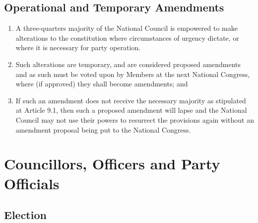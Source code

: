 \documentclass[a4paper,titlepage,8.5pt]{article}
\begin{document}
\subsection{Operational and Temporary Amendments}

\begin{enumerate}
\item A three-quarters majority of the National Council is empowered to make alterations to the constitution where circumstances of urgency dictate, or where it is necessary for party operation.
\item Such alterations are temporary, and are considered proposed amendments and as such must be voted upon by Members at the next National Congress, where (if approved) they shall become amendments; and
\item If such an amendment does not receive the necessary majority as stipulated at Article 9.1, then such a proposed amendment will lapse and the National Council may not use their powers to resurrect the provisions again without an amendment proposal being put to the National Congress.
\end{enumerate}

\section{Councillors, Officers and Party Officials}

\subsection{Election}
\end{document}
